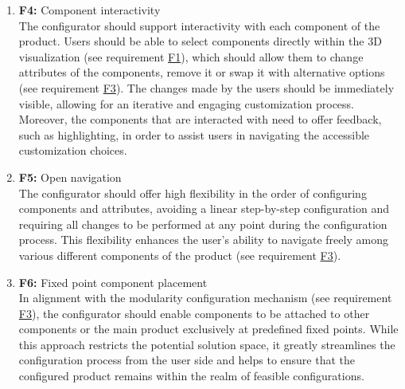 \begin{enumerate}
\item \textbf{F4:} \label{itm:F4} Component interactivity
\vspace{2pt}
\\The configurator should support interactivity with each component of the product. Users should be able to select components directly within the 3D visualization (see requirement \hyperref[itm:F1]{F1}), which should allow them to change attributes of the components, remove it or swap it with alternative options (see requirement \hyperref[itm:F3]{F3}). The changes made by the users should be immediately visible, allowing for an iterative and engaging customization process. Moreover, the components that are interacted with need to offer feedback, such as highlighting, in order to assist users in navigating the accessible customization choices.
\vspace{4pt}

\item \textbf{F5:} Open navigation
\vspace{2pt}
\\The configurator should offer high flexibility in the order of configuring components and attributes, avoiding a linear step-by-step configuration and requiring all changes to be performed at any point during the configuration process. This flexibility enhances the user's ability to navigate freely among various different components of the product (see requirement \hyperref[itm:F3]{F3}).
\vspace{4pt}

\item \textbf{F6:} \label{itm:F6} Fixed point component placement
\vspace{2pt}
\\In alignment with the modularity configuration mechanism (see requirement \hyperref[itm:F3]{F3}), the configurator should enable components to be attached to other components or the main product exclusively at predefined fixed points. While this approach restricts the potential solution space, it greatly streamlines the configuration process from the user side and helps to ensure that the configured product remains within the realm of feasible configurations.
\vspace{4pt}


\end{enumerate}
